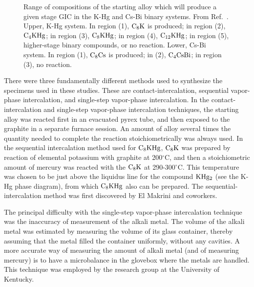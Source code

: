 \begin{figure}
\vspace{7in}
\caption[Range of compositions of the starting alloy which will produce a
given stage   GIC in the    K-Hg  and    Cs-Bi binary  systems.]{Range   of
compositions of the starting alloy which will produce a given  stage GIC in
the K-Hg and Cs-Bi binary systems.  From Ref.~\cite{lagrange87}. Upper, K-Hg
system.   In region  (1), $\rm  C_8K$  is produced; in   region  (2),  $\rm
C_4KHg$; in region  (3), $\rm C_8KHg$; in  region  (4), $\rm C_{12}KHg$; in
region (5), higher-stage  binary  compounds, or  no  reaction. Lower, Cs-Bi
system.  In region (1), $\rm C_8Cs$ is produced;  in (2), $\rm C_4CsBi$; in
region (3), no reaction.}
\label{alloychoice}
\end{figure}

        There were three fundamentally different methods used to synthesize
the specimens used   in these studies.  These  are   contact-intercalation,
sequential  vapor-phase     intercalation,   and single-step    vapor-phase
intercalation.  In the  contact-intercalation and  single-step  vapor-phase
intercalation  techniques,  the starting  alloy was   reacted  first in  an
evacuated pyrex tube,  and then exposed  to  the  graphite in   a  separate
furnace session.  An amount of alloy  several times the  quantity needed to
complete   the  reaction  stoichiometrically   was  always   used.   In the
sequential intercalation  method  used  for $\rm  C_8KHg$,  $\rm  C_8K$ was
prepared  by   reaction    of  elemental   potassium    with  graphite   at
200$^{\circ}$C, and  then a stoichiometric amount of   mercury  was reacted
with the $\rm C_8K$ at 290-300$^{\circ}$C.   This temperature was chosen to
be just above the liquidus line for the compound  $\rm KHg_2$ (see the K-Hg
phase diagram),   from which  $\rm   C_8KHg$  also  can  be prepared.   The
sequential-intercalation  method  was  first discovered   by El Makrini and
coworkers.\cite{elmakrini80a}

        The  principal  difficulty    with the   single-step    vapor-phase
intercalation technique was  the  inaccuracy  of measurement of the  alkali
metal.  The  volume  of  the alkali  metal  was  estimated by measuring the
volume of its glass container, thereby  assuming that the  metal filled the
container uniformly,   without   any cavities.  A   more accurate    way of
measuring the amount of alkali metal (and of  measuring mercury) is to have
a microbalance in  the glovebox where the  metals are handled.   This
technique  was   employed by   the  research group  at   the  University of
Kentucky.\cite{doll86}

